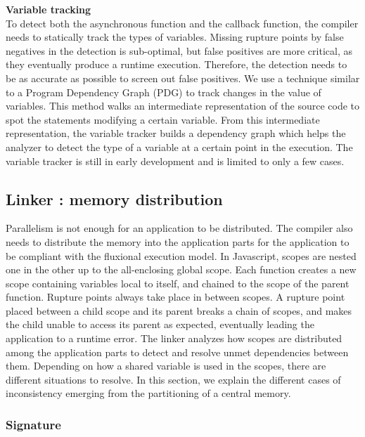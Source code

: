 \textbf{Variable tracking}\\
To detect both the asynchronous function and the callback function, the compiler needs to statically track the types of variables.
Missing rupture points by false negatives in the detection is sub-optimal, but false positives are more critical, as they eventually produce a runtime execution.
Therefore, the detection needs to be as accurate as possible to screen out false positives.
We use a technique similar to a Program Dependency Graph (PDG)\cite{Ferrante1987} to track changes in the value of variables.
This method walks an intermediate representation of the source code to spot the statements modifying a certain variable.
From this intermediate representation, the variable tracker builds a dependency graph which helps the analyzer to detect the type of a variable at a certain point in the execution.
The variable tracker is still in early development and is limited to only a few cases.

\subsection{Linker : memory distribution} \label{section:linker}

Parallelism is not enough for an application to be distributed.
The compiler also needs to distribute the memory into the application parts for the application to be compliant with the fluxional execution model.
In Javascript, scopes are nested one in the other up to the all-enclosing global scope.
Each function creates a new scope containing variables local to itself, and chained to the scope of the parent function.
Rupture points always take place in between scopes.
A rupture point placed between a child scope and its parent breaks a chain of scopes, and makes the child unable to access its parent as expected, eventually leading the application to a runtime error.
The linker analyzes how scopes are distributed among the application parts to detect and resolve unmet dependencies between them.
Depending on how a shared variable is used in the scopes, there are different situations to resolve.
In this section, we explain the different cases of inconsistency emerging from the partitioning of a central memory.

\subsubsection{Signature}

